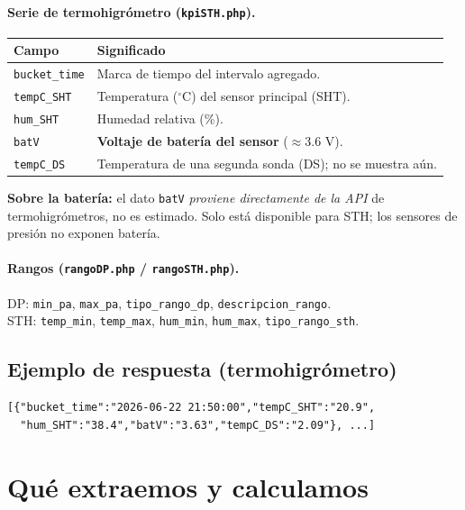 \documentclass[11pt,a4paper]{article}
\newcommand{\code}[1]{\texttt{\small #1}}
\begin{document}
\paragraph{Serie de termohigrómetro (\code{kpiSTH.php}).}
\begin{center}
\begin{tabular}{@{}p{3.4cm}p{11.0cm}@{}}
\toprule
\textbf{Campo} & \textbf{Significado} \\
\midrule
\code{bucket\_time} & Marca de tiempo del intervalo agregado. \\
\code{tempC\_SHT} & Temperatura ($^\circ$C) del sensor principal (SHT). \\
\code{hum\_SHT} & Humedad relativa (\%). \\
\code{batV} & \textbf{Voltaje de batería del sensor} ($\approx$3.6 V). \\
\code{tempC\_DS} & Temperatura de una segunda sonda (DS); no se muestra aún. \\
\bottomrule
\end{tabular}
\end{center}
\noindent\textbf{Sobre la batería:} el dato \code{batV} \emph{proviene directamente de la API}
de termohigrómetros, no es estimado. Solo está disponible para STH; los sensores de presión
no exponen batería.

\paragraph{Rangos (\code{rangoDP.php} / \code{rangoSTH.php}).}
DP: \code{min\_pa}, \code{max\_pa}, \code{tipo\_rango\_dp}, \code{descripcion\_rango}.\\
STH: \code{temp\_min}, \code{temp\_max}, \code{hum\_min}, \code{hum\_max}, \code{tipo\_rango\_sth}.

\subsection{Ejemplo de respuesta (termohigrómetro)}
\begin{verbatim}
[{"bucket_time":"2026-06-22 21:50:00","tempC_SHT":"20.9",
  "hum_SHT":"38.4","batV":"3.63","tempC_DS":"2.09"}, ...]
\end{verbatim}

\section{Qué extraemos y calculamos}
\end{document}

